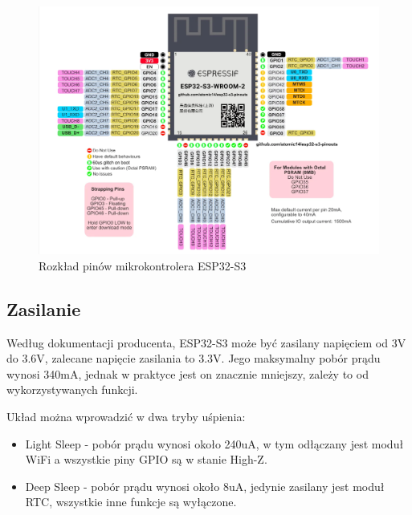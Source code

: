 \documentclass[../main.tex]{subfiles}
\begin{document}
\begin{figure}[H]
  \centering
  \includegraphics[width=1\textwidth]{Esp32.png}
  \caption{Rozkład pinów mikrokontrolera ESP32-S3}
\end{figure}

\subsection{Zasilanie}
Według dokumentacji producenta, ESP32-S3 może być zasilany napięciem od 3V do 3.6V, zalecane napięcie zasilania to 3.3V.
Jego maksymalny pobór prądu wynosi 340mA, jednak w praktyce jest on znacznie mniejszy, zależy to od wykorzystywanych funkcji.

Układ można wprowadzić w dwa tryby uśpienia:
\begin{itemize}
\item Light Sleep - pobór prądu wynosi około 240uA, w tym odłączany jest moduł WiFi a wszystkie piny GPIO są w stanie High-Z.
\item Deep Sleep - pobór prądu wynosi około 8uA, jedynie zasilany jest moduł RTC, wszystkie inne funkcje są wyłączone.
\end{itemize}
\end{document}

